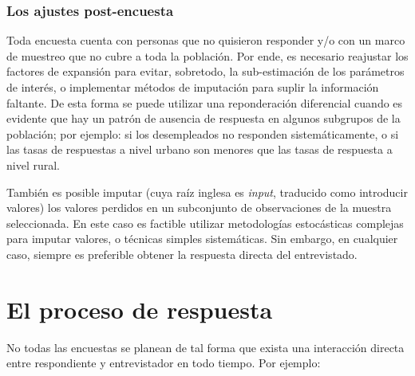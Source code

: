 \documentclass[
  12pt,
  spanish,
]{book}
\begin{document}
\hypertarget{los-ajustes-post-encuesta}{%
\subsubsection*{Los ajustes post-encuesta}\label{los-ajustes-post-encuesta}}

Toda encuesta cuenta con personas que no quisieron responder y/o con un marco de muestreo que no cubre a toda la población. Por ende, es necesario reajustar los factores de expansión para evitar, sobretodo, la sub-estimación de los parámetros de interés, o implementar métodos de imputación para suplir la información faltante. De esta forma se puede utilizar una reponderación diferencial cuando es evidente que hay un patrón de ausencia de respuesta en algunos subgrupos de la población; por ejemplo: si los desempleados no responden sistemáticamente, o si las tasas de respuestas a nivel urbano son menores que las tasas de respuesta a nivel rural.

También es posible imputar (cuya raíz inglesa es \emph{input}, traducido como introducir valores) los valores perdidos en un subconjunto de observaciones de la muestra seleccionada. En este caso es factible utilizar metodologías estocásticas complejas para imputar valores, o técnicas simples sistemáticas. Sin embargo, en cualquier caso, siempre es preferible obtener la respuesta directa del entrevistado.

\hypertarget{el-proceso-de-respuesta}{%
\section{El proceso de respuesta}\label{el-proceso-de-respuesta}}

No todas las encuestas se planean de tal forma que exista una interacción directa entre respondiente y entrevistador en todo tiempo. Por ejemplo:
\end{document}
